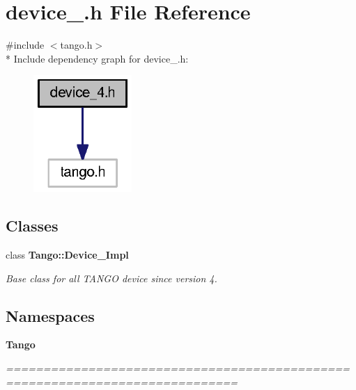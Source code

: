 \section{device\-\_.\-h File Reference}
\label{device__4_8h}
{\ttfamily \#include $<$tango.\-h$>$}\\*
Include dependency graph for device\-\_.\-h\-:
\nopagebreak
\begin{figure}[H]
\begin{center}
\leavevmode
\includegraphics[width=106pt]{d6/d0a/device__4_8h__incl}
\end{center}
\end{figure}
\subsection*{Classes}
\begin{DoxyCompactItemize}
\item 
class {\bf Tango\-::\-Device\-\_\-Impl}
\begin{DoxyCompactList}\small\item\em Base class for all T\-A\-N\-G\-O device since version 4. \end{DoxyCompactList}\end{DoxyCompactItemize}
\subsection*{Namespaces}
\begin{DoxyCompactItemize}
\item 
{\bf Tango}
\begin{DoxyCompactList}\small\item\em ============================================================================= \end{DoxyCompactList}\end{DoxyCompactItemize}
